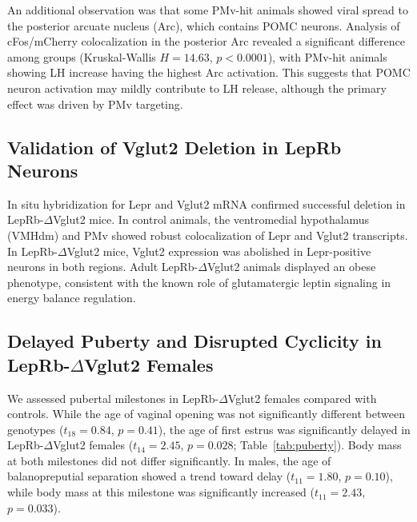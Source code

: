 \documentclass[12pt]{article}
\begin{document}
An additional observation was that some PMv-hit animals showed viral spread to the posterior arcuate nucleus (Arc), which contains POMC neurons. Analysis of cFos/mCherry colocalization in the posterior Arc revealed a significant difference among groups (Kruskal-Wallis $H = 14.63$, $p < 0.0001$), with PMv-hit animals showing LH increase having the highest Arc activation. This suggests that POMC neuron activation may mildly contribute to LH release, although the primary effect was driven by PMv targeting.

\subsection{Validation of Vglut2 Deletion in LepRb Neurons}

In situ hybridization for Lepr and Vglut2 mRNA confirmed successful deletion in LepRb-$\Delta$Vglut2 mice. In control animals, the ventromedial hypothalamus (VMHdm) and PMv showed robust colocalization of Lepr and Vglut2 transcripts. In LepRb-$\Delta$Vglut2 mice, Vglut2 expression was abolished in Lepr-positive neurons in both regions. Adult LepRb-$\Delta$Vglut2 animals displayed an obese phenotype, consistent with the known role of glutamatergic leptin signaling in energy balance regulation.

\subsection{Delayed Puberty and Disrupted Cyclicity in LepRb-$\Delta$Vglut2 Females}

We assessed pubertal milestones in LepRb-$\Delta$Vglut2 females compared with controls. While the age of vaginal opening was not significantly different between genotypes ($t_{18} = 0.84$, $p = 0.41$), the age of first estrus was significantly delayed in LepRb-$\Delta$Vglut2 females ($t_{14} = 2.45$, $p = 0.028$; Table~\ref{tab:puberty}). Body mass at both milestones did not differ significantly. In males, the age of balanopreputial separation showed a trend toward delay ($t_{11} = 1.80$, $p = 0.10$), while body mass at this milestone was significantly increased ($t_{11} = 2.43$, $p = 0.033$).
\end{document}
